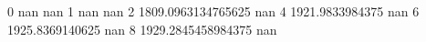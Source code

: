 0 nan nan
1 nan nan
2 1809.0963134765625 nan
4 1921.9833984375 nan
6 1925.8369140625 nan
8 1929.2845458984375 nan
